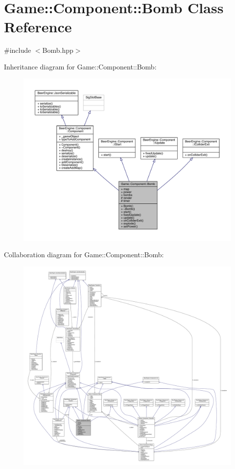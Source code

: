 \hypertarget{class_game_1_1_component_1_1_bomb}{}\section{Game\+:\+:Component\+:\+:Bomb Class Reference}
\label{class_game_1_1_component_1_1_bomb}


{\ttfamily \#include $<$Bomb.\+hpp$>$}



Inheritance diagram for Game\+:\+:Component\+:\+:Bomb\+:\nopagebreak
\begin{figure}[H]
\begin{center}
\leavevmode
\includegraphics[width=350pt]{class_game_1_1_component_1_1_bomb__inherit__graph}
\end{center}
\end{figure}


Collaboration diagram for Game\+:\+:Component\+:\+:Bomb\+:\nopagebreak
\begin{figure}[H]
\begin{center}
\leavevmode
\includegraphics[width=350pt]{class_game_1_1_component_1_1_bomb__coll__graph}
\end{center}
\end{figure}
